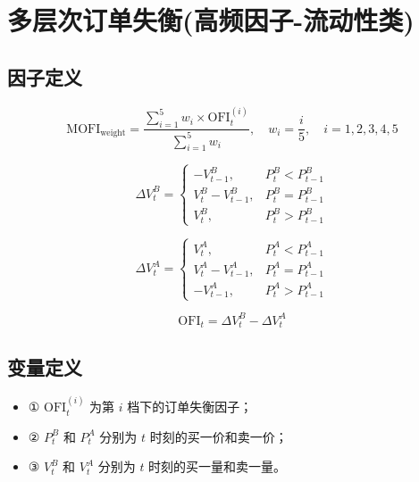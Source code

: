 \documentclass{article}
\begin{document}
\section{多层次订单失衡(高频因子-流动性类)}

\subsection{因子定义}

\begin{equation}
    \mathrm{MOFI}_{\mathrm{weight}} = \frac{\sum_{i=1}^{5} w_i \times \mathrm{OFI}_t^{(i)}}{\sum_{i=1}^{5} w_i}, \quad w_i = \frac{i}{5}, \quad i = 1, 2, 3, 4, 5
\end{equation}

\begin{equation}
    \Delta V_t^B = 
    \begin{cases} 
        -V_{t-1}^B, & P_t^B < P_{t-1}^B \\ 
        V_t^B - V_{t-1}^B, & P_t^B = P_{t-1}^B \\ 
        V_t^B, & P_t^B > P_{t-1}^B 
    \end{cases}
\end{equation}

\begin{equation}
    \Delta V_t^A = 
    \begin{cases} 
        V_t^A, & P_t^A < P_{t-1}^A \\ 
        V_t^A - V_{t-1}^A, & P_t^A = P_{t-1}^A \\ 
        -V_{t-1}^A, & P_t^A > P_{t-1}^A 
    \end{cases}
\end{equation}

\begin{equation}
    \mathrm{OFI}_t = \Delta V_t^B - \Delta V_t^A
\end{equation}

\subsection{变量定义}
\begin{itemize}
    \item ① \( \mathrm{OFI}_t^{(i)} \) 为第 \( i \) 档下的订单失衡因子；
    \item ② \( P_t^B \) 和 \( P_t^A \) 分别为 \( t \) 时刻的买一价和卖一价；
    \item ③ \( V_t^B \) 和 \( V_t^A \) 分别为 \( t \) 时刻的买一量和卖一量。
\end{itemize}
\end{document}
